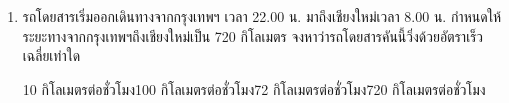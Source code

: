 \begin{enumerate}
	\item \runningj \ncmu รถโดยสารเริ่มออกเดินทางจากกรุงเทพฯ  เวลา   22.00  น.   มาถึงเชียงใหม่เวลา    	8.00 น.   กำหนดให้ระยะทางจากกรุงเทพฯถึงเชียงใหม่เป็น   720  กิโลเมตร   จงหาว่ารถโดยสารคันนี้วิ่งด้วยอัตราเร็วเฉลี่ยเท่าใด 
	\begin{2c}
		{10  กิโลเมตรต่อชั่วโมง}{100  กิโลเมตรต่อชั่วโมง}{72  กิโลเมตรต่อชั่วโมง}{720  กิโลเมตรต่อชั่วโมง}
	\end{2c}
\end{enumerate}
